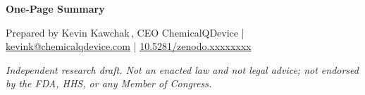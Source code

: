 \documentclass[11pt]{article}
\begin{document}
\thispagestyle{plain}
\begin{center}{\LARGE\bfseries\color{accentcol} One-Page Summary}\end{center}
\begin{center}\small Prepared by Kevin Kawchak\,, CEO ChemicalQDevice \;|\; \href{mailto:kevink@chemicalqdevice.com}{kevink@chemicalqdevice.com} \;|\; \href{https://doi.org/10.5281/zenodo.xxxxxxxx}{10.5281/zenodo.xxxxxxxx}\end{center}
\noindent\footnotesize\textit{Independent research draft. Not an enacted law and not legal advice; not endorsed by the FDA, HHS, or any Member of Congress.}\normalsize\par
\renewcommand{\keywordname}{\textbf{Subject}}\keywords{}








\begingroup\raggedright\nocite{*}\endgroup
\end{document}
